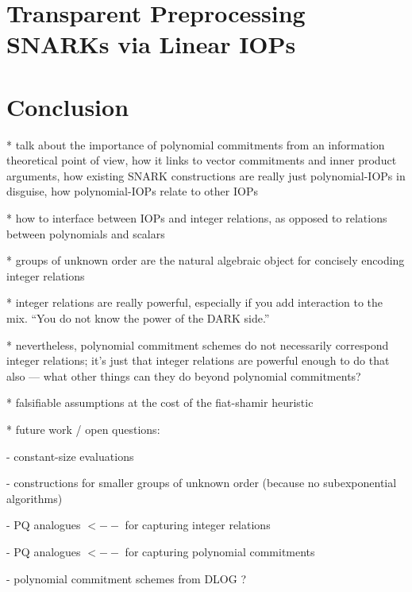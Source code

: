 \documentclass{article}
\theoremstyle{definition}
\begin{document}
\section{Transparent Preprocessing SNARKs via Linear IOPs} 


\section{Conclusion}

 * talk about the importance of polynomial commitments from an information theoretical point of view, how it links to vector commitments and inner product arguments, how existing SNARK constructions are really just polynomial-IOPs in disguise, how polynomial-IOPs relate to other IOPs
 
 * how to interface between IOPs and integer relations, as opposed to relations between polynomials and scalars 
 
 * groups of unknown order are the natural algebraic object for concisely encoding integer relations
 
 * integer relations are really powerful, especially if you add interaction to the mix. ``You do not know the power of the DARK side.''
 
 * nevertheless, polynomial commitment schemes do not necessarily correspond integer relations; it's just that integer relations are powerful enough to do that also --- what other things can they do beyond polynomial commitments?
 
 * falsifiable assumptions at the cost of the fiat-shamir heuristic
 
 * future work / open questions:
 
  - constant-size evaluations
  
  - constructions for smaller groups of unknown order (because no subexponential algorithms)
  
  - PQ analogues $<--$ for capturing integer relations
  
  - PQ analogues $<--$ for capturing polynomial commitments
  
  - polynomial commitment schemes from DLOG ?

%

  

\appendix
\end{document}
